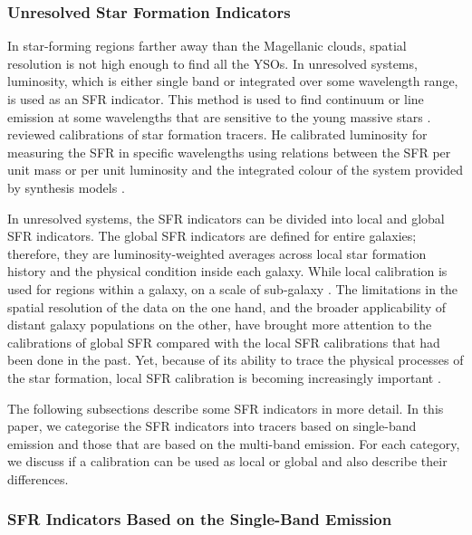 \subsubsection{Unresolved Star Formation Indicators}
 In star-forming regions farther away than the Magellanic clouds, spatial resolution is not high enough to find all the YSOs. In unresolved systems, luminosity, which is either single band or integrated over some wavelength range, is used as an SFR indicator. This method is used to find continuum or line emission at some wavelengths that are sensitive to the young massive stars \citep[e.g.,][]{Kennicutt98b, Calzetti13}. \cite{Kennicutt98b} reviewed calibrations of star formation tracers. He calibrated luminosity for measuring the SFR in specific wavelengths using relations between the SFR per unit mass or per unit luminosity and the integrated colour of the system provided by synthesis models \citep[e.g.,][]{Bruzual93}. 

In unresolved systems, the SFR indicators can be divided into local and global SFR indicators. The global SFR indicators are defined for entire galaxies; therefore, they are luminosity-weighted averages across local star formation history and the physical condition inside each galaxy. While local calibration is used for regions within a galaxy, on a scale of sub-galaxy \citep[e.g.,][]{Zhu08, Kennicutt09, Boquien10, Boquien11, Hao11}. The limitations in the spatial resolution of the data on the one hand, and the broader applicability of distant galaxy populations on the other, have brought more attention to the calibrations of global SFR compared with the local SFR calibrations that had been done in the past. Yet, because of its ability to trace the physical processes of the star formation, local SFR calibration is becoming increasingly important \cite{Calzetti13}.

The following subsections describe some SFR indicators in more detail. In this paper, we categorise the SFR indicators into tracers based on single-band emission and those that are based on the multi-band emission. For each category, we discuss if a calibration can be used as local or global and also describe their differences.  

\subsubsection*{SFR Indicators Based on the Single-Band Emission}

